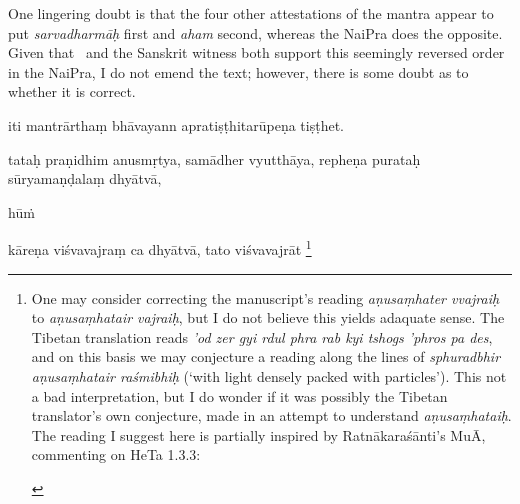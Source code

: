 \documentclass[naipra.tex]{subfiles}
\begin{document}
\begin{sanskrit}
{\begin{english}
	One lingering doubt is that the four other attestations of the mantra appear to put \emph{sarvadharmāḥ} first and \emph{aham} second, whereas the NaiPra does the opposite.
	Given that \TIB\ and the Sanskrit witness both support this seemingly reversed order in the NaiPra, I do not emend the text; however, there is some doubt as to whether it is correct.
\end{english}} iti mantrārthaṃ bhāvayann apratiṣṭhitarūpeṇa tiṣṭhet. 
\pend



\pstart
tataḥ praṇidhim anusmṛtya, samādher vyutthāya, repheṇa purataḥ sūryamaṇḍalaṃ dhyātvā,  \begin{mantra}hūṁ\end{mantra}\dsh kāreṇa viśvavajraṃ ca dhyātvā, tato viśvavajrāt \footnote{\begin{english}
	One may consider correcting the manuscript's reading \emph{aṇusaṃhater vvajraiḥ} to \emph{aṇusaṃhatair vajraiḥ}, but I do not believe this yields adaquate sense.
	The Tibetan translation reads \emph{'od zer gyi rdul phra rab kyi tshogs 'phros pa des}, and on this basis we may conjecture a reading along the lines of \emph{sphuradbhir aṇusaṃhatair raśmibhiḥ} (`with light densely packed with particles'). 
	This not a bad interpretation, but I do wonder if it was possibly the Tibetan translator's own conjecture, made in an attempt to understand \emph{aṇusaṃhataiḥ}.
	The reading I suggest here is partially inspired by Ratnākaraśānti's MuĀ, commenting on HeTa 1.3.3:


\end{english}}
\end{sanskrit}
\end{document}

